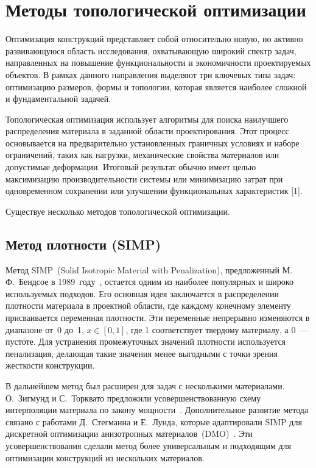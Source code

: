 \section{Методы топологической оптимизации}\label{sec:ch1/sec2}

Оптимизация конструкций представляет собой относительно новую, но активно развивающуюся область исследования, охватывающую широкий спектр задач, направленных на повышение функциональности и экономичности проектируемых объектов. В рамках данного направления выделяют три ключевых типа задач: оптимизацию размеров, формы и топологии, которая является наиболее сложной и фундаментальной задачей.

Топологическая оптимизация использует алгоритмы для поиска наилучшего распределения материала в заданной области проектирования. Этот процесс основывается на предварительно установленных граничных условиях и наборе ограничений, таких как нагрузки, механические свойства материалов или допустимые деформации. Итоговый результат обычно имеет целью максимизацию производительности системы или минимизацию затрат при одновременном сохранении или улучшении функциональных характеристик [1]. 





Существуе несколько методов топологической оптимизации.

\subsection{Метод плотности (SIMP)}


Метод SIMP~(Solid Isotropic Material with Penalization), предложенный М.\,Ф.~Бендсое в 1989~году~\cite{b:1989}, остается одним из наиболее популярных и широко используемых подходов. Его основная идея заключается в распределении плотности материала в проектной области, где каждому конечному элементу присваивается переменная плотности. Эти переменные непрерывно изменяются в диапазоне от~0 до~1, $x\in[0,1]$, где 1 соответствует твердому материалу, а 0~--- пустоте. Для устранения промежуточных значений плотности используется пенализация, делающая такие значения менее выгодными с точки зрения жесткости конструкции.

В дальнейшем метод был расширен для задач с несколькими материалами. О.~Зигмунд и С.~Торквато предложили усовершенствованную схему интерполяции материала по закону мощности~\cite{s:1997}. Дополнительное развитие метода связано с работами Д.~Стегманна и Е.~Лунда, которые адаптировали SIMP для дискретной оптимизации анизотропных материалов~(DMO)~\cite{s:2005, l:2006}. Эти усовершенствования сделали метод более универсальным и подходящим для оптимизации конструкций из нескольких материалов.

